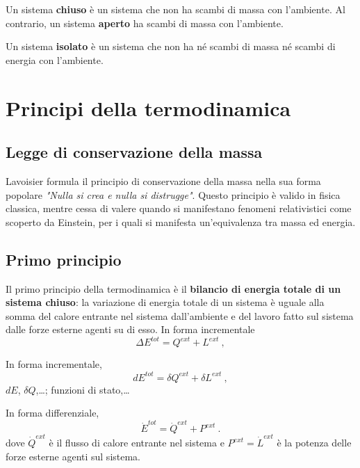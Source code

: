 \begin{definition} Un sistema \textbf{chiuso} è un sistema che non ha scambi di massa con l'ambiente. Al contrario, un sistema \textbf{aperto} ha scambi di massa con l'ambiente.
\end{definition}

\begin{definition} Un sistema \textbf{isolato} è un sistema che non ha né scambi di massa né scambi di energia con l'ambiente.
\end{definition}

\section{Principi della termodinamica}
\subsection{Legge di conservazione della massa}
Lavoisier formula il principio di conservazione della massa nella sua forma popolare \textit{"Nulla si crea e nulla si distrugge"}. Questo principio è valido in fisica classica, mentre cessa di valere quando si manifestano fenomeni relativistici come scoperto da Einstein, per i quali si manifesta un'equivalenza tra massa ed energia.

\subsection{Primo principio}
Il primo principio della termodinamica è il \textbf{bilancio di energia totale di un sistema chiuso}: la variazione di energia totale di un sistema è uguale alla somma del calore entrante nel sistema dall'ambiente e del lavoro fatto sul sistema dalle forze esterne agenti su di esso. In forma incrementale
\begin{equation}
  \Delta E^{tot} = Q^{ext} + L^{ext} \ ,
\end{equation}

\noindent
In forma incrementale,
\begin{equation}
  d E^{tot} = \delta Q^{ext} + \delta L^{ext} \ ,
\end{equation}
{\color{red} $dE$, $\delta Q$,\dots; funzioni di stato,\dots}

\noindent
In forma differenziale,
\begin{equation}
  \dot{E}^{tot} = \dot{Q}^{ext} + P^{ext} \ .
\end{equation}
dove $\dot{Q}^{ext}$ è il flusso di calore entrante nel sistema e $P^{ext} = \dot{L}^{ext}$ è la potenza delle forze esterne agenti sul sistema.
%
